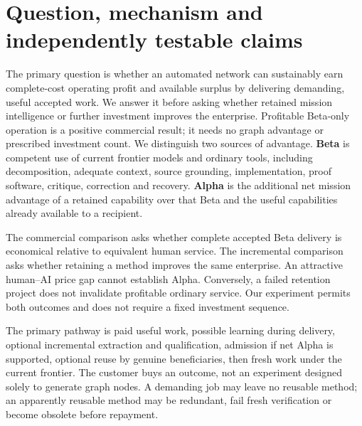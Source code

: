 \documentclass[11pt,letterpaper]{article}
\begin{document}
\section{Question, mechanism and independently testable claims}

The primary question is whether an automated network can sustainably earn complete-cost operating profit and available surplus by delivering demanding, useful accepted work. We answer it before asking whether retained mission intelligence or further investment improves the enterprise. Profitable Beta-only operation is a positive commercial result; it needs no graph advantage or prescribed investment count. We distinguish two sources of advantage. \textbf{Beta} is competent use of current frontier models and ordinary tools, including decomposition, adequate context, source grounding, implementation, proof software, critique, correction and recovery. \textbf{Alpha} is the additional net mission advantage of a retained capability over that Beta and the useful capabilities already available to a recipient.

The commercial comparison asks whether complete accepted Beta delivery is economical relative to equivalent human service. The incremental comparison asks whether retaining a method improves the same enterprise. An attractive human--AI price gap cannot establish Alpha. Conversely, a failed retention project does not invalidate profitable ordinary service. Our experiment permits both outcomes and does not require a fixed investment sequence.

The primary pathway is paid useful work, possible learning during delivery, optional incremental extraction and qualification, admission if net Alpha is supported, optional reuse by genuine beneficiaries, then fresh work under the current frontier. The customer buys an outcome, not an experiment designed solely to generate graph nodes. A demanding job may leave no reusable method; an apparently reusable method may be redundant, fail fresh verification or become obsolete before repayment.
\end{document}
